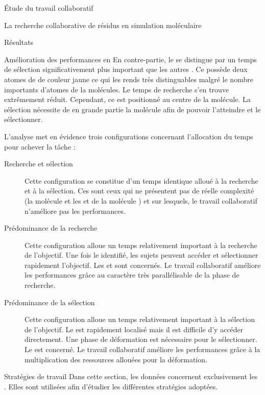 \documentclass[myfrancais]{mythesis}
\begin{document}
\begin{mypart}{Étude du travail collaboratif}
\begin{mychapter}{La recherche collaborative de résidus en simulation moléculaire}
\begin{mysection}{Résultats}
\begin{mysubsection}{Amélioration des performances en }
					En contre-partie, le   se distingue par un temps de sélection significativement plus important que les autres .
					Ce  possède deux atomes de  de couleur jaune ce qui les rends très distinguables malgré le nombre importants d'atomes de la molécules.
					Le temps de recherche s'en trouve extrêmement réduit.
					Cependant, ce  est positionné au centre de la molécule.
					La sélection nécessite de  en grande partie la molécule afin de pouvoir l'atteindre et le sélectionner.

					L'analyse met en évidence trois configurations concernant l'allocation du temps pour achever la tâche :
					\begin{description}
						\item[Recherche et sélection]
							Cette configuration se constitue d'un temps identique alloué à la recherche et à la sélection.
							Ces  sont ceux qui ne présentent pas de réelle complexité (la molécule \myTRPCAGE et les   et  de la molécule \myPrion) et sur lesquels, le travail collaboratif n'améliore pas les performances.
						\item[Prédominance de la recherche]
							Cette configuration alloue un temps relativement important à la recherche de l'objectif.
							Une fois le  identifié, les sujets peuvent accéder et sélectionner rapidement l'objectif.
							Les   et  sont concernés.
							Le travail collaboratif améliore les performances grâce au caractère très parallélisable de la phase de recherche.
						\item[Prédominance de la sélection]
							Cette configuration alloue un temps relativement important à la sélection de l'objectif.
							Le  est rapidement localisé mais il est difficile d'y accéder directement.
							Une phase de déformation est nécessaire pour le sélectionner.
							Le   est concerné.
							Le travail collaboratif améliore les performances grâce à la multiplication des ressources allouées pour la déformation.
					\end{description}
				\end{mysubsection}
				\begin{mysubsection}{Stratégies de travail}
					Dans cette section, les données concernent exclusivement les .
					Elles sont utilisées afin d'étudier les différentes stratégies adoptées.


\end{mysubsection}
\end{mysection}
\end{mychapter}
\end{mypart}
\end{document}
